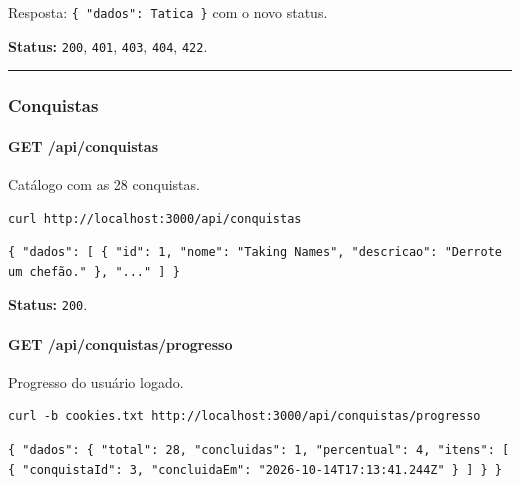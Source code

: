 Resposta: \texttt{\{\ "dados":\ Tatica\ \}} com o novo status.

\textbf{Status:} \texttt{200}, \texttt{401}, \texttt{403}, \texttt{404},
\texttt{422}.

\begin{center}\rule{0.5\linewidth}{0.5pt}\end{center}

\hypertarget{conquistas}{%
\subsubsection{Conquistas}\label{conquistas}}

\hypertarget{get-apiconquistas}{%
\paragraph{GET /api/conquistas}\label{get-apiconquistas}}

Catálogo com as 28 conquistas.

\begin{Verbatim}[breaklines,breakanywhere,fontsize=\scriptsize]
curl http://localhost:3000/api/conquistas
\end{Verbatim}

\begin{Verbatim}[breaklines,breakanywhere,fontsize=\scriptsize]
{ "dados": [ { "id": 1, "nome": "Taking Names", "descricao": "Derrote um chefão." }, "..." ] }
\end{Verbatim}

\textbf{Status:} \texttt{200}.

\hypertarget{get-apiconquistasprogresso}{%
\paragraph{GET
/api/conquistas/progresso}\label{get-apiconquistasprogresso}}

Progresso do usuário logado.

\begin{Verbatim}[breaklines,breakanywhere,fontsize=\scriptsize]
curl -b cookies.txt http://localhost:3000/api/conquistas/progresso
\end{Verbatim}

\begin{Verbatim}[breaklines,breakanywhere,fontsize=\scriptsize]
{ "dados": { "total": 28, "concluidas": 1, "percentual": 4, "itens": [ { "conquistaId": 3, "concluidaEm": "2026-10-14T17:13:41.244Z" } ] } }
\end{Verbatim}

